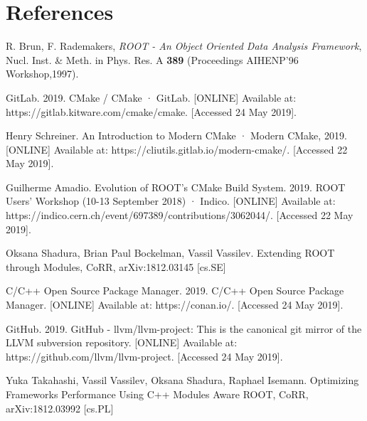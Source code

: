 \documentclass[12pt]{iopart}
\begin{document}
\section*{References}
\begin{thebibliography}{10}

R. Brun, F. Rademakers, \textit{ROOT - An Object Oriented Data Analysis Framework}, Nucl. Inst. \& Meth. in Phys. Res. A  \textbf{389} (Proceedings AIHENP'96 Workshop,1997).

GitLab. 2019. CMake / CMake · GitLab. [ONLINE] Available at: https://gitlab.kitware.com/cmake/cmake. [Accessed 24 May 2019]. 

Henry Schreiner. An Introduction to Modern CMake · Modern CMake, 2019. [ONLINE] Available at: https://cliutils.gitlab.io/modern-cmake/. [Accessed 22 May 2019]. 

Guilherme Amadio. Evolution of ROOT's CMake Build System. 2019. ROOT Users' Workshop (10-13 September 2018) · Indico. [ONLINE] Available at: https://indico.cern.ch/event/697389/contributions/3062044/. [Accessed 22 May 2019].

Oksana Shadura, Brian Paul Bockelman, Vassil Vassilev. Extending ROOT through Modules, CoRR, arXiv:1812.03145 [cs.SE]

C/C++ Open Source Package Manager. 2019. C/C++ Open Source Package Manager. [ONLINE] Available at: https://conan.io/. [Accessed 24 May 2019]. 

GitHub. 2019. GitHub - llvm/llvm-project: This is the canonical git mirror of the LLVM subversion repository. [ONLINE] Available at: https://github.com/llvm/llvm-project. [Accessed 24 May 2019]. 

Yuka Takahashi, Vassil Vassilev, Oksana Shadura, Raphael Isemann. Optimizing Frameworks Performance Using C++ Modules Aware ROOT, CoRR, arXiv:1812.03992 [cs.PL]

\end{thebibliography}
\end{document}
